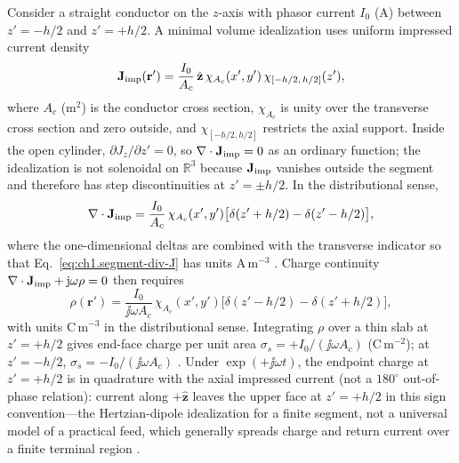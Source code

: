 \begin{example}
\label{ex:ch1.green-dipole-element}
Consider a straight conductor on the $z$-axis with phasor current $I_0$ (A) between $z'=-h/2$ and $z'=+h/2$. A minimal volume idealization uses uniform impressed current density
\[
\mathbf{J}_{\mathrm{imp}}(\mathbf{r}')
=\frac{I_0}{A_c}\,\hat{\mathbf{z}}\,
\chi_{A_c}(x',y')\,\chi_{[-h/2,\,h/2]}(z'),
\]
where $A_c$ (m$^2$) is the conductor cross section, $\chi_{A_c}$ is unity over the transverse cross section and zero outside, and $\chi_{[-h/2,h/2]}$ restricts the axial support. Inside the open cylinder, $\partial J_z/\partial z'=0$, so $\nabla\cdot\mathbf{J}_{\mathrm{imp}}=0$ as an ordinary function; the idealization is not solenoidal on $\mathbb{R}^3$ because $\mathbf{J}_{\mathrm{imp}}$ vanishes outside the segment and therefore has step discontinuities at $z'=\pm h/2$. In the distributional sense,
\begin{equation}
\label{eq:ch1.segment-div-J}
\nabla\cdot\mathbf{J}_{\mathrm{imp}}
=\frac{I_0}{A_c}\,\chi_{A_c}(x',y')\bigl[\delta(z'+h/2)-\delta(z'-h/2)\bigr],
\end{equation}
where the one-dimensional deltas are combined with the transverse indicator so that Eq.~\eqref{eq:ch1.segment-div-J} has units A\,m$^{-3}$ \cite{jackson1999,stratton1941}. Charge continuity $\nabla\cdot\mathbf{J}_{\mathrm{imp}}+\mathrm{j}\omega\rho=0$ then requires
\begin{equation}
\label{eq:ch1.segment-end-charge}
\rho(\mathbf{r}')
=\frac{I_0}{\jj\omega A_c}\,\chi_{A_c}(x',y')\bigl[\delta(z'-h/2)-\delta(z'+h/2)\bigr],
\end{equation}
with units C\,m$^{-3}$ in the distributional sense. Integrating $\rho$ over a thin slab at $z'=+h/2$ gives end-face charge per unit area $\sigma_s=+I_0/(\jj\omega A_c)$ (C\,m$^{-2}$); at $z'=-h/2$, $\sigma_s=-I_0/(\jj\omega A_c)$ \cite{jackson1999,stratton1941}. Under $\exp(+\jj\omega t)$, the endpoint charge at $z'=+h/2$ is in quadrature with the axial impressed current (not a $180^\circ$ out-of-phase relation): current along $+\hat{\mathbf{z}}$ leaves the upper face at $z'=+h/2$ in this sign convention---the Hertzian-dipole idealization for a finite segment, not a universal model of a practical feed, which generally spreads charge and return current over a finite terminal region \cite{stratton1941,jackson1999}.


\end{example}
